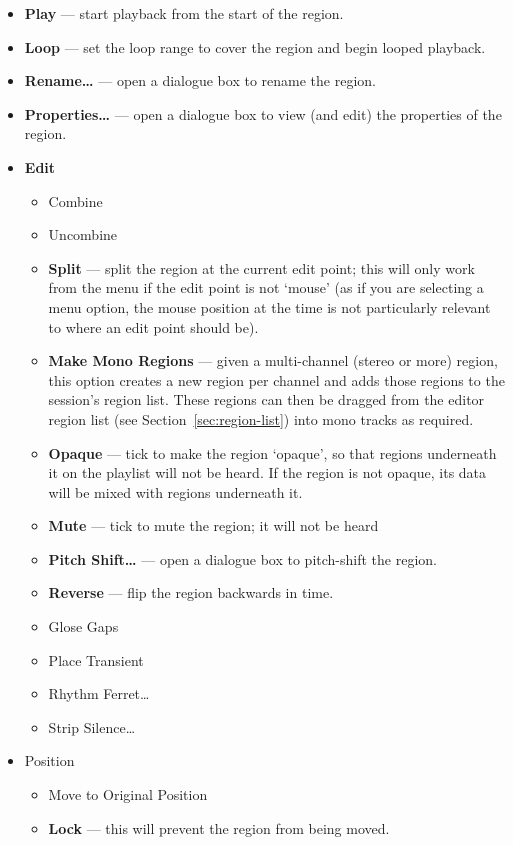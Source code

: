 \documentclass[10pt,a4paper]{book}
\begin{document}
\begin{itemize}
\item \textbf{Play} --- start playback from the start of the region.
\item \textbf{Loop} --- set the loop range to cover the region and begin looped playback.
\item \textbf{Rename\ldots} --- open a dialogue box to rename the region.
\item \textbf{Properties\ldots} --- open a dialogue box to view (and edit) the properties of the region.
\item \textbf{Edit}
\begin{itemize}
\item Combine
\item Uncombine
\item \textbf{Split} --- split the region at the current edit point;
  this will only work from the menu if the edit point is not `mouse'
  (as if you are selecting a menu option, the mouse position at the
  time is not particularly relevant to where an edit point should be).
\item \textbf{Make Mono Regions} --- given a multi-channel (stereo or
  more) region, this option creates a new region per channel and adds
  those regions to the session's region list.  These regions can then
  be dragged from the editor region list (see
  Section~\ref{sec:region-list}) into mono tracks as required.
\item \textbf{Opaque} --- tick to make the region `opaque', so that
  regions underneath it on the playlist will not be heard.  If the
  region is not opaque, its data will be mixed with regions underneath
  it.
\item \textbf{Mute} --- tick to mute the region; it will not be heard
\item \textbf{Pitch Shift\ldots} --- open a dialogue box to
  pitch-shift the region.
\item \textbf{Reverse} --- flip the region backwards in time.
\item Glose Gaps
\item Place Transient
\item Rhythm Ferret\ldots
\item Strip Silence\ldots
\end{itemize}
\item Position
\begin{itemize}
\item Move to Original Position
\item \textbf{Lock} --- this will prevent the region from being moved.

\end{itemize}
\end{itemize}
\end{document}
